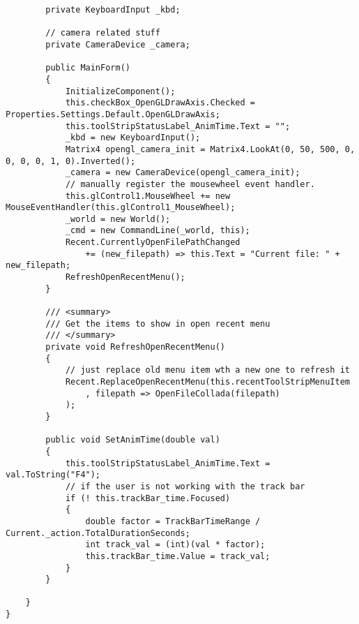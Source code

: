 \begin{scriptsize}
\begin{verbatim}
        private KeyboardInput _kbd;

        // camera related stuff
        private CameraDevice _camera;

        public MainForm()
        {
            InitializeComponent();
            this.checkBox_OpenGLDrawAxis.Checked = Properties.Settings.Default.OpenGLDrawAxis;
            this.toolStripStatusLabel_AnimTime.Text = "";
            _kbd = new KeyboardInput();
            Matrix4 opengl_camera_init = Matrix4.LookAt(0, 50, 500, 0, 0, 0, 0, 1, 0).Inverted();
            _camera = new CameraDevice(opengl_camera_init);
            // manually register the mousewheel event handler.
            this.glControl1.MouseWheel += new MouseEventHandler(this.glControl1_MouseWheel);
            _world = new World();
            _cmd = new CommandLine(_world, this);
            Recent.CurrentlyOpenFilePathChanged
                += (new_filepath) => this.Text = "Current file: " + new_filepath;
            RefreshOpenRecentMenu();
        }

        /// <summary>
        /// Get the items to show in open recent menu
        /// </summary>
        private void RefreshOpenRecentMenu()
        {
            // just replace old menu item wth a new one to refresh it
            Recent.ReplaceOpenRecentMenu(this.recentToolStripMenuItem
                , filepath => OpenFileCollada(filepath)
            );
        }

        public void SetAnimTime(double val)
        {
            this.toolStripStatusLabel_AnimTime.Text = val.ToString("F4");
            // if the user is not working with the track bar
            if (! this.trackBar_time.Focused)
            {
                double factor = TrackBarTimeRange / Current._action.TotalDurationSeconds;
                int track_val = (int)(val * factor);
                this.trackBar_time.Value = track_val;
            }
        }

    }
}

\end{verbatim}
\end{scriptsize}
